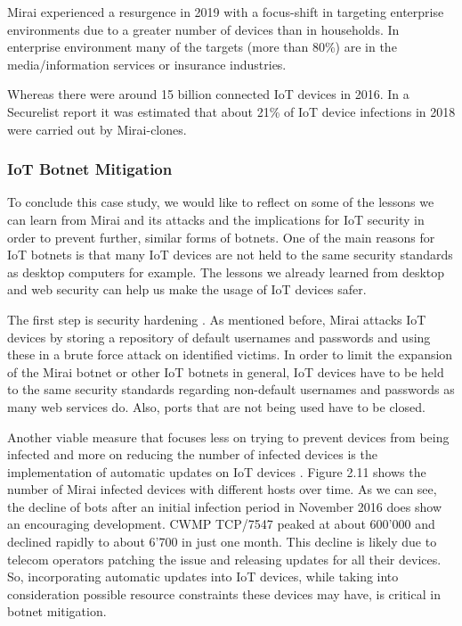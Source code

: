 Mirai experienced a resurgence in 2019 with a focus-shift in targeting enterprise environments due to a greater number of devices than in households. In enterprise environment many of the targets (more than 80\%) are in the media/information services or insurance industries. \cite{Lemos19}

Whereas there were around 15 billion connected IoT devices in 2016. \cite{Ericsson} In a Securelist report it was estimated that about 21\% of IoT device infections in 2018 were carried out by Mirai-clones. \cite{Eremin19}

\subsubsection{IoT Botnet Mitigation}
To conclude this case study, we would like to reflect on some of the lessons we can learn from Mirai and its attacks and the implications for IoT security in order to prevent further, similar forms of botnets. One of the main reasons for IoT botnets is that many IoT devices are not held to the same security standards as desktop computers for example. The lessons we already learned from desktop and web security can help us make the usage of IoT devices safer.

The first step is security hardening \cite{Antonakakis17}. As mentioned before, Mirai attacks IoT devices by storing a repository of default usernames and passwords and using these in a brute force attack on identified victims.  In order to limit the expansion of the Mirai botnet or other IoT botnets in general, IoT devices have to be held to the same security standards regarding non-default usernames and passwords as many web services do. Also, ports that are not being used have to be closed.

Another viable measure that focuses less on trying to prevent devices from being infected and more on reducing the number of infected devices is the implementation of automatic updates on IoT devices \cite{Antonakakis17}. Figure 2.11 shows the number of Mirai infected devices with different hosts over time. As we can see, the decline of bots after an initial infection period in November 2016 does show an encouraging development. CWMP TCP/7547 peaked at about 600'000 and declined rapidly to about 6'700 in just one month. This decline is likely due to telecom operators patching the issue and releasing updates for all their devices. So, incorporating automatic updates into IoT devices, while taking into consideration possible resource constraints these devices may have, is critical in botnet mitigation.

